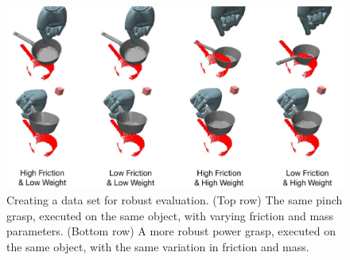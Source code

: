 \begin{figure}[t]
\includegraphics[width=\columnwidth]{images/frictionweight}
\caption{Creating a data set for robust evaluation. (Top row) The same pinch grasp, executed on the same object, with varying friction and mass parameters. (Bottom row) A more robust power grasp, executed on the same object, with the same variation in friction and mass. \label{fig:evaluative-training}}
\end{figure}

